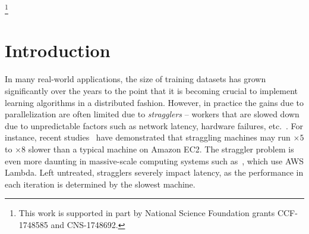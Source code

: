 \documentclass[conference,letterpaper]{IEEEtran}
\newcommand\blfootnote[1]{%
  \begingroup
  \renewcommand\thefootnote{}\footnote{#1}%
  \addtocounter{footnote}{-1}%
  \endgroup
}
\begin{document}
\blfootnote{This work is supported in part by National Science Foundation grants CCF-1748585 and CNS-1748692. 
}


\section{Introduction}
\label{sec:intro}







In many real-world applications, the size of training datasets has grown significantly over the years to the point that it is becoming crucial to implement learning algorithms in a distributed fashion. 
However, in practice the gains due to parallelization are often limited due to {\it stragglers} -- workers that are slowed down due to unpredictable factors such as network latency, hardware failures, etc.~\cite{Hoefler:10:noise,Dean:13:tail}. 
For instance, recent studies~\cite{Tandon:17,Yadwadkar:16} have demonstrated that straggling machines may run $\times 5$ to $\times 8$ slower than a typical machine on Amazon EC2. The straggler problem is even more daunting in massive-scale computing systems such as~\cite{Jonas:17}, which use AWS Lambda. 
Left untreated, stragglers severely impact latency, as the performance in each iteration is determined by the slowest machine. 
\end{document}
